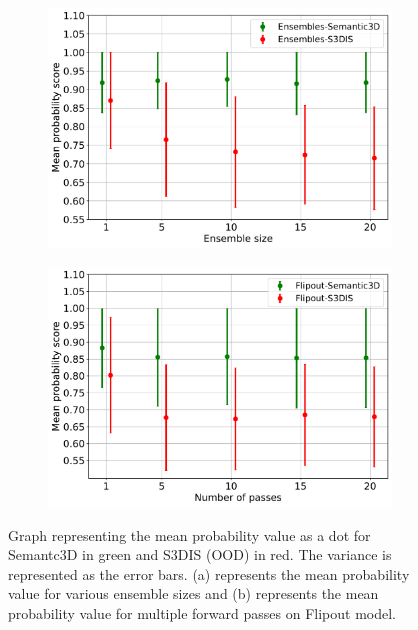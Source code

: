     \begin{figure}[!ht]
        \begin{subfigure}{0.98\textwidth}
            \centering
        \includegraphics[scale=0.5]{images/MSP/Ensembles_MSP_semvs3d.pdf}
        \caption{}
        \label{fig:msp_ensembles}
        \end{subfigure}
        \begin{subfigure}{0.98\textwidth}
            \centering
        \includegraphics[scale=0.5]{images/MSP/Flipout_MSP_semvs3d.pdf}
        \caption{}
        \label{fig:msp_flipout}
        \end{subfigure}
        \caption{Graph representing the mean probability value as a dot for Semantc3D in green and S3DIS (OOD) in red. The variance is represented as the error bars.  (a) represents the mean probability value for various ensemble sizes and (b) represents the mean probability value for multiple forward passes on Flipout model.}
    \end{figure}

